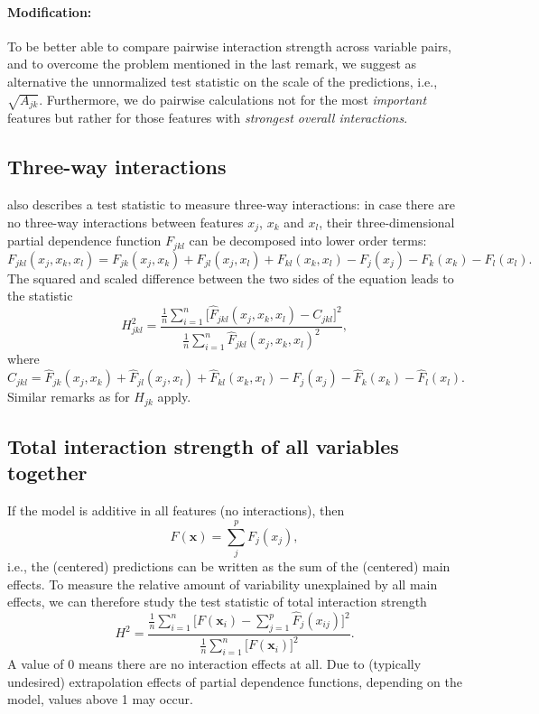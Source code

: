 \documentclass[]{article}
\begin{document}
\paragraph{Modification:} To be better able to compare pairwise interaction strength across variable pairs, and to overcome the problem mentioned in the last remark, we suggest as alternative the unnormalized test statistic on the scale of the predictions, i.e., $\sqrt{A_{jk}}$. 
Furthermore, we do pairwise calculations not for the most {\em important} features but rather for those features with {\em strongest overall interactions}.

\subsection{Three-way interactions}
\cite{friedman2008} also describes a test statistic to measure three-way interactions: in case there are no three-way interactions between features $x_j$, $x_k$ and $x_l$, their three-dimensional partial dependence function $F_{jkl}$ can be decomposed into lower order terms:
$$
  F_{jkl}(x_j, x_k, x_l) = F_{jk}(x_j, x_k) + F_{jl}(x_j, x_l) + F_{kl}(x_k, x_l) - F_j(x_j) - F_k(x_k) - F_l(x_l).
$$
The squared and scaled difference between the two sides of the equation leads to the statistic
$$
  H_{jkl}^2 = \frac{\frac{1}{n} \sum_{i = 1}^n \big[\hat F_{jkl}(x_j, x_k, x_l) - C_{jkl}\big]^2}{\frac{1}{n} \sum_{i = 1}^n \hat F_{jkl}(x_j, x_k, x_l)^2},
$$
where
$$
	C_{jkl} = \hat F_{jk}(x_j, x_k) + \hat F_{jl}(x_j, x_l) + \hat F_{kl}(x_k, x_l) - \hat F_j(x_j) - \hat F_k(x_k) - \hat F_l(x_l).
$$
Similar remarks as for $H_{jk}$ apply.

\subsection{Total interaction strength of all variables together}
If the model is additive in all features (no interactions), then
$$
	F(\mathbf{x}) = \sum_{j}^{p} F_j(x_j),
$$
i.e., the (centered) predictions can be written as the sum of the (centered) main effects.
To measure the relative amount of variability unexplained by all main effects, we can therefore study the test statistic of total interaction strength
$$
  H^2 = \frac{\frac{1}{n} \sum_{i = 1}^n \big[F(\mathbf{x}_i) - \sum_{j = 1}^p\hat F_j(x_{ij})\big]^2}{\frac{1}{n} \sum_{i = 1}^n\big[F(\mathbf{x}_i)\big]^2}.
$$
A value of 0 means there are no interaction effects at all. Due to (typically undesired) extrapolation effects of partial dependence functions, depending on the model, values above 1 may occur.
\end{document}
